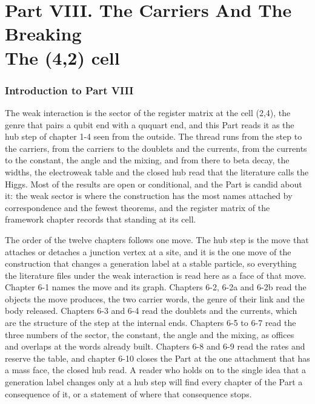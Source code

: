 \clearpage
\part*{Part VIII. The Carriers And The Breaking\\[5pt]{\large The (4,2) cell}}
\label{atlaspart:08-cell-4-2-weak}
\section*{Introduction to Part VIII}\label{narr:part:VI}
The weak interaction is the sector of the register matrix at the cell (2,4), the genre that pairs a qubit end with a ququart end, and this Part reads it as the hub step of chapter 1-4 seen from the outside. The thread runs from the step to the carriers, from the carriers to the doublets and the currents, from the currents to the constant, the angle and the mixing, and from there to beta decay, the widths, the electroweak table and the closed hub read that the literature calls the Higgs. Most of the results are open or conditional, and the Part is candid about it: the weak sector is where the construction has the most names attached by correspondence and the fewest theorems, and the register matrix of the framework chapter records that standing at its cell.

The order of the twelve chapters follows one move. The hub step is the move that attaches or detaches a junction vertex at a site, and it is the one move of the construction that changes a generation label at a stable particle, so everything the literature files under the weak interaction is read here as a face of that move. Chapter 6-1 names the move and its graph. Chapters 6-2, 6-2a and 6-2b read the objects the move produces, the two carrier words, the genre of their link and the body released. Chapters 6-3 and 6-4 read the doublets and the currents, which are the structure of the step at the internal ends. Chapters 6-5 to 6-7 read the three numbers of the sector, the constant, the angle and the mixing, as offices and overlaps at the words already built. Chapters 6-8 and 6-9 read the rates and reserve the table, and chapter 6-10 closes the Part at the one attachment that has a mass face, the closed hub read. A reader who holds on to the single idea that a generation label changes only at a hub step will find every chapter of the Part a consequence of it, or a statement of where that consequence stops.

